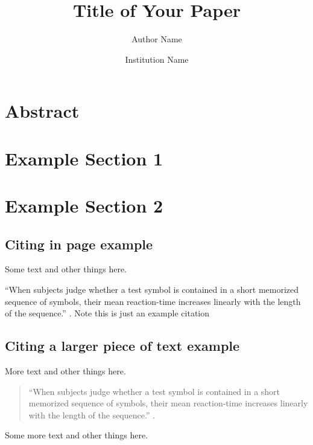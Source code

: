 \documentclass[letterpaper, 12pt, titlepage]{article}
\begin{document}
\title{{\myfont Title of Your Paper\vspace{-2.5ex}}}
\author{Author Name}
\date{Institution Name}

\pagestyle{fancy}
\maketitle

\section*{\centering Abstract}
\blindtext[1]

\newpage

\section{Example Section 1}
\blindtext[1]

\blindtext[1]

\section{Example Section 2}
\subsection{Citing in page example}
Some text and other things here.

``When subjects judge whether a test symbol is contained in a short memorized
sequence of symbols, their mean reaction-time increases linearly with the length
of the sequence.'' \cite{sternberg1966high}.
Note this is just an example citation 

\subsection{Citing a larger piece of text example}

More text and other things here.
\begin{quote}
``When subjects judge whether a test symbol is contained in a short memorized
sequence of symbols, their mean reaction-time increases linearly with the length
of the sequence.'' \cite{sternberg1966high}.
  \end{quote}

Some more text and other things here.



\newpage




\end{document}
